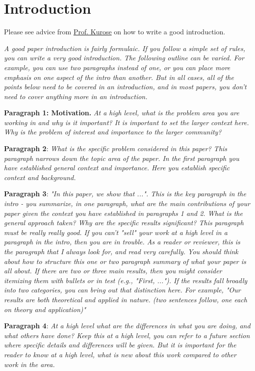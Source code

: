 \section{Introduction}
\label{sec:intro}

Please see advice from \href{https://www.cs.columbia.edu/~hgs/etc/intro-style.html}{Prof. Kurose} on how to write a good introduction. 


\textit{A good paper introduction is fairly formulaic. If you follow a simple set of rules, you can write a very good introduction. The following outline can be varied. For example, you can use two paragraphs instead of one, or you can place more emphasis on one aspect of the intro than another. But in all cases, all of the points below need to be covered in an introduction, and in most papers, you don't need to cover anything more in an introduction.}

\textbf{Paragraph 1: Motivation.} \textit{At a high level, what is the problem area you are working in and why is it important? It is important to set the larger context here. Why is the problem of interest and importance to the larger community?}

\textbf{Paragraph 2}: \textit{What is the specific problem considered in this paper? This paragraph narrows down the topic area of the paper. In the first paragraph you have established general context and importance. Here you establish specific context and background.}

\textbf{Paragraph 3}: \textit{"In this paper, we show that ...". This is the key paragraph in the intro - you summarize, in one paragraph, what are the main contributions of your paper given the context you have established in paragraphs 1 and 2. What is the general approach taken? Why are the specific results significant? This paragraph must be really really good. If you can't "sell" your work at a high level in a paragraph in the intro, then you are in trouble. As a reader or reviewer, this is the paragraph that I always look for, and read very carefully.
You should think about how to structure this one or two paragraph summary of what your paper is all about. If there are two or three main results, then you might consider itemizing them with bullets or in test (e.g., "First, ..."). If the results fall broadly into two categories, you can bring out that distinction here. For example, "Our results are both theoretical and applied in nature. (two sentences follow, one each on theory and application)"}

\textbf{Paragraph 4}: \textit{At a high level what are the differences in what you are doing, and what others have done? Keep this at a high level, you can refer to a future section where specific details and differences will be given. But it is important for the reader to know at a high level, what is new about this work compared to other work in the area.}

